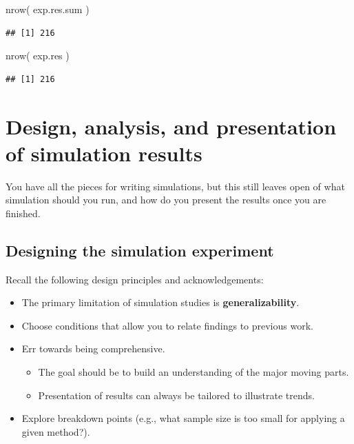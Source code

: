 \documentclass[
]{book}
\newenvironment{Shaded}{\begin{snugshade}}{\end{snugshade}}
\newcommand{\FunctionTok}[1]{\textcolor[rgb]{0.00,0.00,0.00}{#1}}
\newcommand{\NormalTok}[1]{#1}
\providecommand{\tightlist}{%
  \setlength{\itemsep}{0pt}\setlength{\parskip}{0pt}}
\begin{document}
\begin{Shaded}
\begin{Highlighting}[]
\FunctionTok{nrow}\NormalTok{( exp.res.sum )}
\end{Highlighting}
\end{Shaded}

\begin{verbatim}
## [1] 216
\end{verbatim}

\begin{Shaded}
\begin{Highlighting}[]
\FunctionTok{nrow}\NormalTok{( exp.res )}
\end{Highlighting}
\end{Shaded}

\begin{verbatim}
## [1] 216
\end{verbatim}

\hypertarget{design-analysis-and-presentation-of-simulation-results}{%
\chapter{Design, analysis, and presentation of simulation results}\label{design-analysis-and-presentation-of-simulation-results}}

You have all the pieces for writing simulations, but this still leaves open of what simulation should you run, and how do you present the results once you are finished.

\hypertarget{designing-the-simulation-experiment}{%
\section{Designing the simulation experiment}\label{designing-the-simulation-experiment}}

Recall the following design principles and acknowledgements:

\begin{itemize}
\tightlist
\item
  The primary limitation of simulation studies is \textbf{generalizability}.
\item
  Choose conditions that allow you to relate findings to previous work.
\item
  Err towards being comprehensive.

  \begin{itemize}
  \tightlist
  \item
    The goal should be to build an understanding of the major moving parts.
  \item
    Presentation of results can always be tailored to illustrate trends.
  \end{itemize}
\item
  Explore breakdown points (e.g., what sample size is too small for applying a given method?).
\end{itemize}
\end{document}
